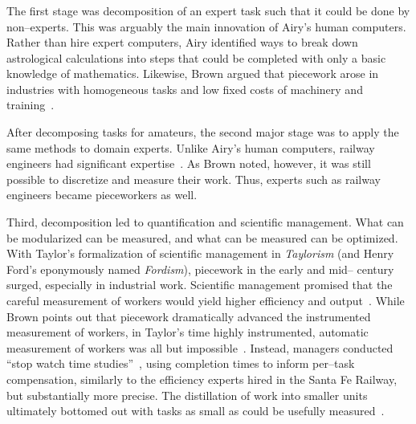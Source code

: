 \documentclass[pn4226]{subfiles}
\begin{document}
\subsubsection{\pieceworkpers}

\begin{comment}
notes: what info do i assume the reader has seen already?
- Brown: Task variability matters
- Airy and his human computers were great:
  - quickly verifiable
  - independent tasks (could be checked without the whole product)
  - narrowly trainable
\end{comment}

The first stage was decomposition of an expert task such that it could be done by non--experts. 
This was arguably the main innovation of Airy's human computers.
Rather than hire expert computers, Airy identified ways to break down astrological calculations into steps that could be completed with only a basic knowledge of mathematics.
Likewise, Brown argued that piecework arose in industries with homogeneous tasks and low fixed costs of machinery and training~\cite{Brown01041990}.

After decomposing tasks for amateurs, the second major stage was to apply the same methods to domain experts. 
Unlike Airy's human computers, railway engineers had significant expertise~\cite{Brown01041990}.
As Brown noted, however, it was still possible to discretize and measure their work.
Thus, experts such as railway engineers became pieceworkers as well.

Third, decomposition led to quantification and scientific management.
What can be modularized can be measured, and what can be measured can be optimized.
With Taylor's formalization of scientific management in \textit{Taylorism}
(and Henry Ford's eponymously named \textit{Fordism}),
piecework in the early and mid-- century surged, especially in industrial work.
Scientific management promised that the careful measurement of workers would yield
higher efficiency and output~\cite{taylor1914principles,towardsGlobalFordism}.
While Brown points out that
piecework dramatically advanced the instrumented measurement of workers,
in Taylor's time highly instrumented,
automatic measurement of workers was all but impossible~\cite{Brown01041990}.
Instead, managers conducted ``stop watch time studies''~\cite{nadworny1955scientific},
using completion times to inform per--task compensation,
similarly to the efficiency experts hired in the Santa Fe Railway, but
substantially more precise.
The distillation of work into smaller units ultimately bottomed out with tasks as small as could be usefully measured~\cite{10.2307/23702539}.
\end{document}
